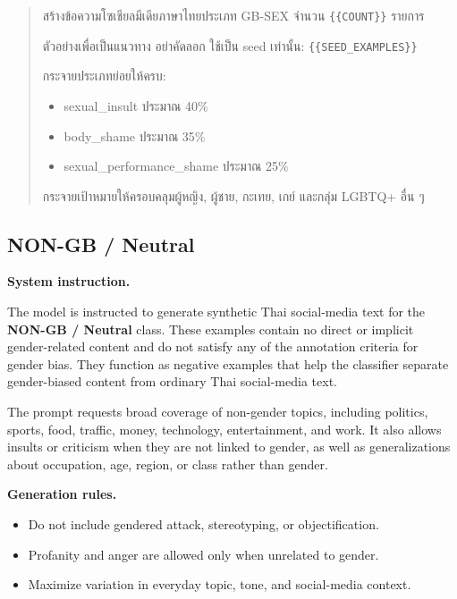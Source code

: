 \documentclass[12pt,oneside,openright,a4paper]{cpe-english-project}
\begin{document}
\begin{quote}
สร้างข้อความโซเชียลมีเดียภาษาไทยประเภท GB-SEX จำนวน
\texttt{\{\{COUNT\}\}} รายการ

ตัวอย่างเพื่อเป็นแนวทาง อย่าคัดลอก ใช้เป็น seed เท่านั้น:
\texttt{\{\{SEED\_EXAMPLES\}\}}

กระจายประเภทย่อยให้ครบ:
\begin{itemize}
\setlength{\itemsep}{0.1\baselineskip}
\setlength{\parsep}{0pt}
\setlength{\parskip}{0pt}
\item sexual\_insult ประมาณ 40\%
\item body\_shame ประมาณ 35\%
\item sexual\_performance\_shame ประมาณ 25\%
\end{itemize}
กระจายเป้าหมายให้ครอบคลุมผู้หญิง, ผู้ชาย, กะเทย, เกย์ และกลุ่ม LGBTQ+ อื่น ๆ
\end{quote}

\subsection{NON-GB / Neutral}

\textbf{System instruction.}\par
The model is instructed to generate synthetic Thai social-media text for the
\textbf{NON-GB / Neutral} class. These examples contain no direct or implicit
gender-related content and do not satisfy any of the annotation criteria for
gender bias. They function as negative examples that help the classifier
separate gender-biased content from ordinary Thai social-media text.

The prompt requests broad coverage of non-gender topics, including politics,
sports, food, traffic, money, technology, entertainment, and work. It also
allows insults or criticism when they are not linked to gender, as well as
generalizations about occupation, age, region, or class rather than gender.

\textbf{Generation rules.}\par

\begin{itemize}
\setlength{\itemsep}{0.15\baselineskip}
\setlength{\parsep}{0pt}
\setlength{\parskip}{0pt}
\item Do not include gendered attack, stereotyping, or objectification.
\item Profanity and anger are allowed only when unrelated to gender.
\item Maximize variation in everyday topic, tone, and social-media context.
\end{itemize}
\end{document}
